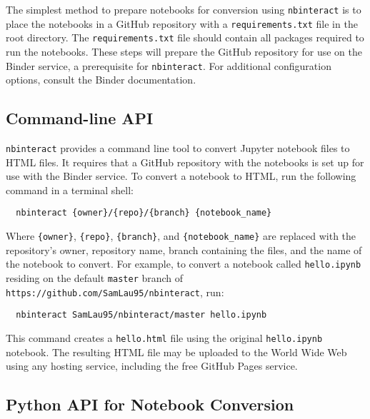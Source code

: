\documentclass[nobib]{tufte-handout}
\newcommand{\code}[1]{\texttt{#1}}
\begin{document}
The simplest method to prepare notebooks for conversion using \code{nbinteract}
is to place the notebooks in a GitHub repository with a \code{requirements.txt}
file in the root directory. The \code{requirements.txt} file should contain all
packages required to run the notebooks. These steps will prepare the GitHub
repository for use on the Binder service, a prerequisite for \code{nbinteract}.
For additional configuration options, consult the Binder
documentation.


\subsection{Command-line API} %
\label{sub:command_line_api}

\code{nbinteract} provides a command line tool to convert Jupyter notebook
files to HTML files. It requires that a GitHub repository with the notebooks is
set up for use with the Binder service. To convert a notebook to HTML, run the
following command in a terminal shell:

\begin{verbatim}
  nbinteract {owner}/{repo}/{branch} {notebook_name}
\end{verbatim}

Where \code{\{owner\}}, \code{\{repo\}}, \code{\{branch\}}, and
\verb|{notebook_name}| are replaced with the repository's owner, repository
name, branch containing the files, and the name of the notebook to convert. For
example, to convert a notebook called \code{hello.ipynb} residing on the
default \code{master} branch of \code{https://github.com/SamLau95/nbinteract},
run:

\begin{verbatim}
  nbinteract SamLau95/nbinteract/master hello.ipynb
\end{verbatim}

This command creates a \code{hello.html} file using the original
\code{hello.ipynb} notebook. The resulting HTML file may be
uploaded to the World Wide Web using any hosting service, including the free
GitHub Pages service.


\subsection{Python API for Notebook Conversion} %
\label{sub:python_api}
\end{document}
